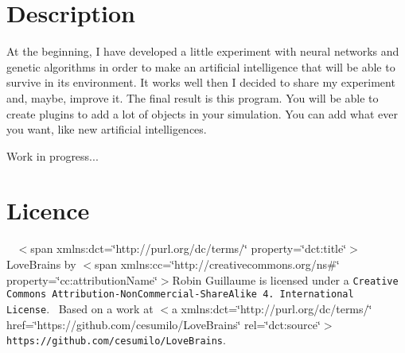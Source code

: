 \section*{Description}

At the beginning, I have developed a little experiment with neural networks and genetic algorithms in order to make an artificial intelligence that will be able to survive in its environment. It works well then I decided to share my experiment and, maybe, improve it. The final result is this program. You will be able to create plugins to add a lot of objects in your simulation. You can add what ever you want, like new artificial intelligences.

Work in progress...

\section*{Licence}

{\tt }~\newline
$<$span xmlns\+:dct=\char`\"{}http\+://purl.\+org/dc/terms/\char`\"{} property=\char`\"{}dct\+:title\char`\"{}$>$Love\+Brains by $<$span xmlns\+:cc=\char`\"{}http\+://creativecommons.\+org/ns\#\char`\"{} property=\char`\"{}cc\+:attribution\+Name\char`\"{}$>$Robin Guillaume is licensed under a {\tt Creative Commons Attribution-\/\+Non\+Commercial-\/\+Share\+Alike 4. International License}.~\newline
Based on a work at $<$a xmlns\+:dct=\char`\"{}http\+://purl.\+org/dc/terms/\char`\"{} href=\char`\"{}https\+://github.\+com/cesumilo/\+Love\+Brains\char`\"{} rel=\char`\"{}dct\+:source\char`\"{}$>${\tt https\+://github.\+com/cesumilo/\+Love\+Brains}. 